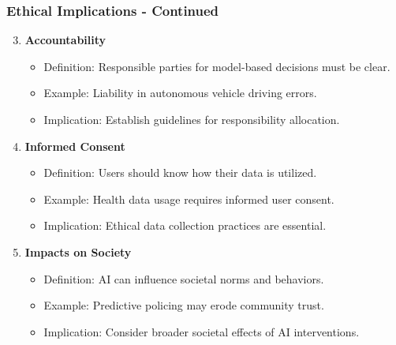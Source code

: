 \documentclass[aspectratio=169]{beamer}
\begin{document}
\begin{frame}[fragile]
    \frametitle{Ethical Implications - Continued}
    \begin{enumerate}
        \setcounter{enumi}{2}
        \item \textbf{Accountability}
            \begin{itemize}
                \item Definition: Responsible parties for model-based decisions must be clear.
                \item Example: Liability in autonomous vehicle driving errors.
                \item Implication: Establish guidelines for responsibility allocation.
            \end{itemize}

        \item \textbf{Informed Consent}
            \begin{itemize}
                \item Definition: Users should know how their data is utilized.
                \item Example: Health data usage requires informed user consent.
                \item Implication: Ethical data collection practices are essential.
            \end{itemize}

        \item \textbf{Impacts on Society}
            \begin{itemize}
                \item Definition: AI can influence societal norms and behaviors.
                \item Example: Predictive policing may erode community trust.
                \item Implication: Consider broader societal effects of AI interventions.
            \end{itemize}
    \end{enumerate}
\end{frame}
\end{document}
